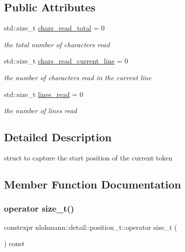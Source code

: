 \subsection*{Public Attributes}
\begin{DoxyCompactItemize}
\item 
std\+::size\+\_\+t \hyperlink{structnlohmann_1_1detail_1_1position__t_a94cf85cd91d478c20ae143eba906ea1a}{chars\+\_\+read\+\_\+total} = 0
\begin{DoxyCompactList}\small\item\em the total number of characters read \end{DoxyCompactList}\item 
std\+::size\+\_\+t \hyperlink{structnlohmann_1_1detail_1_1position__t_a74df94563dd32102152ceb8c6d9041d8}{chars\+\_\+read\+\_\+current\+\_\+line} = 0
\begin{DoxyCompactList}\small\item\em the number of characters read in the current line \end{DoxyCompactList}\item 
std\+::size\+\_\+t \hyperlink{structnlohmann_1_1detail_1_1position__t_a4bbad8bc2c0d17c1b61c3ce729908b71}{lines\+\_\+read} = 0
\begin{DoxyCompactList}\small\item\em the number of lines read \end{DoxyCompactList}\end{DoxyCompactItemize}


\subsection{Detailed Description}
struct to capture the start position of the current token 

\subsection{Member Function Documentation}
\mbox{\label{structnlohmann_1_1detail_1_1position__t_ac9ad1e0f143f162e2e0c979cd678d683}} 
\subsubsection{\texorpdfstring{operator size\+\_\+t()}{operator size\_t()}}
{\footnotesize\ttfamily constexpr nlohmann\+::detail\+::position\+\_\+t\+::operator size\+\_\+t (\begin{DoxyParamCaption}{ }\end{DoxyParamCaption}) const\hspace{0.3cm}{\ttfamily [inline]}}



